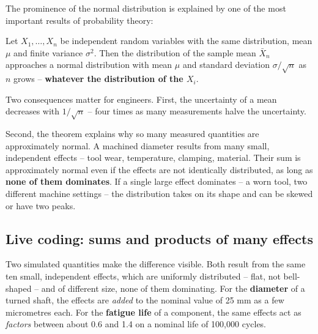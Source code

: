 \documentclass[
  letterpaper,
  DIV=11,
  numbers=noendperiod]{scrreprt}
\begin{document}
The prominence of the normal distribution is explained by one of the
most important results of probability theory:

\begin{tcolorbox}[enhanced jigsaw, left=2mm, title=\textcolor{quarto-callout-important-color}{\faExclamation}\hspace{0.5em}{Theorem: Central limit theorem}, opacityback=0, breakable, rightrule=.15mm, arc=.35mm, toptitle=1mm, colbacktitle=quarto-callout-important-color!10!white, opacitybacktitle=0.6, coltitle=black, colframe=quarto-callout-important-color-frame, bottomrule=.15mm, leftrule=.75mm, bottomtitle=1mm, titlerule=0mm, toprule=.15mm, colback=white]

Let \(X_1, \dots, X_n\) be independent random variables with the same
distribution, mean \(\mu\) and finite variance \(\sigma^2\). Then the
distribution of the sample mean \(\bar X_n\) approaches a normal
distribution with mean \(\mu\) and standard deviation
\(\sigma/\sqrt{n}\) as \(n\) grows -- \textbf{whatever the distribution
of the \(X_i\)}.

\end{tcolorbox}

Two consequences matter for engineers. First, the uncertainty of a mean
decreases with \(1/\sqrt{n}\) -- four times as many measurements halve
the uncertainty.

Second, the theorem explains why so many measured quantities are
approximately normal. A machined diameter results from many small,
independent effects -- tool wear, temperature, clamping, material. Their
sum is approximately normal even if the effects are not identically
distributed, as long as \textbf{none of them dominates}. If a single
large effect dominates -- a worn tool, two different machine settings --
the distribution takes on its shape and can be skewed or have two peaks.

\subsection{Live coding: sums and products of many
effects}\label{live-coding-sums-and-products-of-many-effects}

Two simulated quantities make the difference visible. Both result from
the same ten small, independent effects, which are uniformly distributed
-- flat, not bell-shaped -- and of different size, none of them
dominating. For the \textbf{diameter} of a turned shaft, the effects are
\emph{added} to the nominal value of 25 mm as a few micrometres each.
For the \textbf{fatigue life} of a component, the same effects act as
\emph{factors} between about 0.6 and 1.4 on a nominal life of 100,000
cycles.
\end{document}

